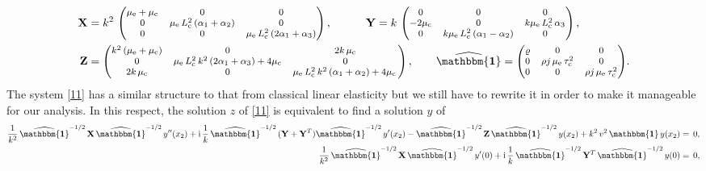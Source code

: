 \documentclass[10pt]{article}
\newcommand{\id}{{\mathbf{\mathbbm{1}}}}
\begin{document}
 \begin{align}\label{x47}
 {\mathbf{X}}&=k^2\,\begin{footnotesize}\begin{pmatrix}  \mu_{\rm e} +\mu_{\rm c} &0	&0
 	\\
 	0& \mu_{\rm e}\,L_{\rm c}^2\,(\alpha_1+\alpha_2) 
 	&0
 	\\0
 	& 0 & {\mu_{\rm e}\,L_{\rm c}^2}\,(2\alpha_1+\alpha_3) \end{pmatrix}\end{footnotesize},\qquad\quad  {\mathbf{Y}}=k\,\begin{footnotesize}\begin{pmatrix}  0& 0 & 0
 	\\
 	-2\mu_{\rm c} & 0 
 	& k{\mu_{\rm e}\,L_{\rm c}^2}\,\alpha_3
 	\\0  
 	& k{\mu_{\rm e}\,L_{\rm c}^2}\,(\alpha_1-\alpha_2) & 0 \end{pmatrix}\end{footnotesize},\\
 {\mathbf{Z}}&=\begin{footnotesize}\begin{pmatrix} k^2\,(\mu_{\rm e} +\mu_{\rm c} ) & 0	& 2k\,\mu_{\rm c}
 	\\
 	0 & {\mu_{\rm e}\,L_{\rm c}^2}\,k^2\,(2\alpha_1+\alpha_3)+4 \mu_{\rm c}
 	& 0
 	\\2k\,\mu_{\rm c}
 	& 0 & {\mu_{\rm e}\,L_{\rm c}^2}\,k^2\,(\alpha_1+\alpha_2)+4 \mu_{\rm c} \, \end{pmatrix}\end{footnotesize}, \qquad  {
 \widehat{\id}=\begin{footnotesize}\begin{pmatrix} 
 	\varrho & 0 & 0 \\
 		0 & \rho j\,\mu_{\rm e}\,\tau_{\rm c}^2 & 0 \\
 		0 & 0 & \rho j\,\mu_{\rm e}\,\tau_{\rm c}^2\end{pmatrix}\end{footnotesize}}.\notag
 \end{align}
 The system \eqref{11} has a similar structure to that from classical linear elasticity \cite{fu2002new} but we still have to rewrite it in order to make it  manageable for our analysis.  In this respect, the  solution $z$ of \eqref{11} is equivalent to find a  solution $y$ of 
 \begin{align}\label{11t}
 \frac{1}{k^2}\,\widehat{\id}^{-1/2}\,{\mathbf{X}}\,\widehat{\id}^{-1/2}\,y''(x_2)+ {\rm i}\,\frac{1}{k}\, \widehat{\id}^{-1/2}\,({\mathbf{Y}}+{\mathbf{Y}}^T)\widehat{\id}^{-1/2}\,y'(x_2) -\widehat{\id}^{-1/2}\,{\mathbf{Z}}\,\widehat{\id}^{-1/2}\,y(x_2)+k^2\, v^2 \, \id\,y(x_2)&=\,0,\\
  \frac{1}{k^2}\,\widehat{\id}^{-1/2}\,{\mathbf{X}}\,\widehat{\id}^{-1/2}\,y'(0)+ {\rm i}\, \frac{1}{k}\,\widehat{\id}^{-1/2}\,{\mathbf{Y}}^T\,\widehat{\id}^{-1/2}\,y(0)&=\,0,\notag
 \end{align}
\end{document}
